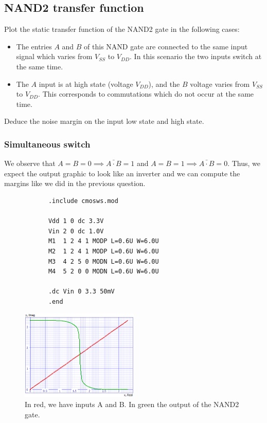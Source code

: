 \documentclass[../main.tex]{subfiles}
\begin{document}
	\subsection{NAND2 transfer function}
	{
	\begin{tcolorbox}[colback=gray!5!white,colframe=gray!75!black]
		Plot the static transfer function of the NAND2 gate in the following cases:
		\begin{itemize}
			\item The entries $A$ and $B$ of this NAND gate are connected to the same input signal which varies from $V_{SS}$ to $V_{DD}$. In this scenario the two inputs switch at the same time.
			\item The $A$ input is at high state (voltage $V_{DD}$), and the $B$ voltage varies from $V_{SS}$ to $V_{DD}$. This corresponds to commutations which do not occur at the same time.
		\end{itemize}
		Deduce the noise margin on the input low state and high state.
	\end{tcolorbox}
	
	\subsubsection{Simultaneous switch}
	{
		
		We observe that $A = B = 0 \implies \bar{A \cdot B} = 1$ and $A = B = 1 \implies \bar{A \cdot B} = 0$. Thus, we expect the output graphic to look like an inverter and we can compute the margins like we did in the previous question.
		
		\begin{lstlisting}
			.include cmosws.mod
			
			Vdd 1 0 dc 3.3V
			Vin 2 0 dc 1.0V
			M1  1 2 4 1 MODP L=0.6U W=6.0U
			M2  1 2 4 1 MODP L=0.6U W=6.0U
			M3  4 2 5 0 MODN L=0.6U W=6.0U
			M4  5 2 0 0 MODN L=0.6U W=6.0U
			
			.dc Vin 0 3.3 50mV
			.end
		\end{lstlisting}
		
		\begin{figure}[H]
			\centering
			\includegraphics[width=0.5\textwidth]{plots/Q5_1.png}
			\caption{In red, we have inputs A and B. In green the output of the NAND2 gate.}
		\end{figure}
		
}}
\end{document}
